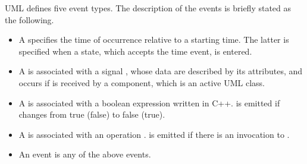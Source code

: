 UML defines five event types. 
The description of the events is briefly stated as the following.

	\begin{itemize}[\footnotesize]
		\item A  specifies the time of occurrence  relative to a starting time. 
		The latter is specified when a state, which accepts the time event, is entered.
		
		\item A  is associated with a signal , whose data are described by its attributes, and occurs if  is received by a component, which is an active UML class.
		
		\item A  is associated with a boolean expression  written in C++.  is emitted if  changes from true (false) to false (true).
		
		\item A  is associated with an operation . 
		 is emitted if there is an invocation to .
		
		\item An  event is any of the above events.
	\end{itemize}

